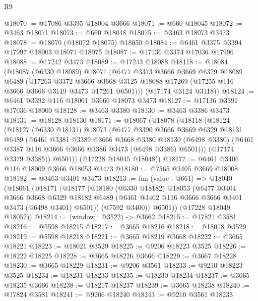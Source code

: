 \begin{lexlean}{R9}
\begin{coremodule}
@18070 := @17086 @3395 @18004 @3666
@18071 := @660 @18045
@18072 := @3463 @18071
@18073 := @660 @18048
@18075 := @3463 @18073 @3473
@18078 := @18070 (@18072 @18075) @18050
@18084 := @6461 @3375 @3394 @17997 @18003 @18071 @18075
@18087 := @17136 @3374 @17036 @17996
@18088 := @17242 @3473
@18089 := @17243 @18088
@18118 := @18084
    (@18087
      (@6330 @18089)
      @18071
      (@6477
        @3373
        @3666
        @3669
        @6329
        @18089
        @6489
        (@17263
          @3372
          @3666
          @3668
          @3125
          @18088
          @17269
          (@17255 @116 @3666 @3666 @3119 @3473 @17261 @6501)))
      (@17174 @3124 @3118))
@18124 := @6461 @3392 @116 @18001 @3666 @18073 @3473
@18127 := @17136 @3391 @17036 @18000
@18128 := @3463 @3380
@18130 := @3463 @3386 @3473
@18131 := @18128 @18130
@18171 := @18067
    (@18078
      (@18118
        (@18124
          (@18127
            (@6330 @18131)
            @18073
            (@6477
              @3390
              @3666
              @3669
              @6329
              @18131
              @6489
              (@6461
                @3381
                @3389
                @3666
                @3668
                @3380
                @18130
                (@6498 @3380)
                (@6461 @3387 @116 @3666 @3666 @3386 @3473 (@6498 @3386) @6501)))
            (@17174 @3379 @3385))
          @6501))
      (@17228 @18045 @18048))
@18177 := @6461 @3406 @116 @18009 @3666 @18053 @3473
@18180 := @7565 @3405 @3669 @18008
@18182 := @3463 @3401 @3473
@18213 := fun (value : @661) =>
  @18040
    (@18061
      (@18171
        (@18177
          (@18180
            (@6330 @18182)
            @18053
            (@6477
              @3404
              @3666
              @3668
              @6329
              @18182
              @6489
              (@6461 @3402 @116 @3666 @3666 @3401 @3473 (@6498 @3401) @6501))
            (@7592 @3400))
          @6501))
      (@17228 @18049 @18052))
@18214 := (window : @3522) -> @3662
@18215 := @17821 @3581
@18216 := @5598 @18215
@18217 := @3665 @18216
@18218 := @18018 @3529
@18219 := @5598 @18218
@18221 := @3665 @18219 @3668
@18222 := @3665 @18221
@18223 := @18021 @3529
@18225 := @9206 @18223 @3525
@18226 := @18222 @18225
@18228 := @3665 @18226 @3666
@18229 := @3667 @18228
@18230 := @3665 @18229
@18231 := @9206 @3561
@18233 := @9210 @18223 @3525
@18234 := @18231 @18233
@18235 := @18230 @18234
@18237 := @3665 @18235 @3666
@18238 := @18217 @18237
@18239 := @3665 @18238
@18240 := @17824 @3581
@18241 := @9206 @18240
@18243 := @9210 @3561 @18233

\end{coremodule}
\end{lexlean}
